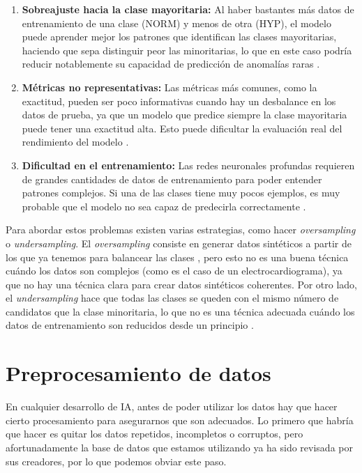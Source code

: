 \begin{enumerate}
	\item \textbf{Sobreajuste hacia la clase mayoritaria:} Al haber bastantes más datos de entrenamiento de una clase (NORM) y menos de otra (HYP), el modelo puede aprender mejor los patrones que identifican las clases mayoritarias, haciendo que sepa distinguir peor las minoritarias, lo que en este caso podría reducir notablemente su capacidad de predicción de anomalías raras \citep{IData}.
	
	\item \textbf{Métricas no representativas:} Las métricas más comunes, como la exactitud, pueden ser poco informativas cuando hay un desbalance en los datos de prueba, ya que un modelo que predice siempre la clase mayoritaria puede tener una exactitud alta. Esto puede dificultar la evaluación real del rendimiento del modelo \citep{ClassOfIData}.
	
	\item \textbf{Dificultad en el entrenamiento:} Las redes neuronales profundas requieren de grandes cantidades de datos de entrenamiento para poder entender patrones complejos. Si una de las clases tiene muy pocos ejemplos, es muy probable que el modelo no sea capaz de predecirla correctamente \citep{Leevy}.
\end{enumerate}

Para abordar estos problemas existen varias estrategias, como hacer \emph{oversampling} o \emph{undersampling}. El \emph{oversampling} consiste en generar datos sintéticos a partir de los que ya tenemos para balancear las clases \citep{he2008adasyn}, pero esto no es una buena técnica cuándo los datos son complejos (como es el caso de un electrocardiograma), ya que no hay una técnica clara para crear datos sintéticos coherentes. Por otro lado, el \emph{undersampling} hace que todas las clases se queden con el mismo número de candidatos que la clase minoritaria, lo que no es una técnica adecuada cuándo los datos de entrenamiento son reducidos desde un principio \citep{koziarski2019radial}.

\section{Preprocesamiento de datos}
\label{sec:procesamiento}
En cualquier desarrollo de IA, antes de poder utilizar los datos hay que hacer cierto procesamiento para asegurarnos que son adecuados. Lo primero que habría que hacer es quitar los datos repetidos, incompletos o corruptos, pero afortunadamente la base de datos que estamos utilizando ya ha sido revisada por sus creadores, por lo que podemos obviar este paso.


